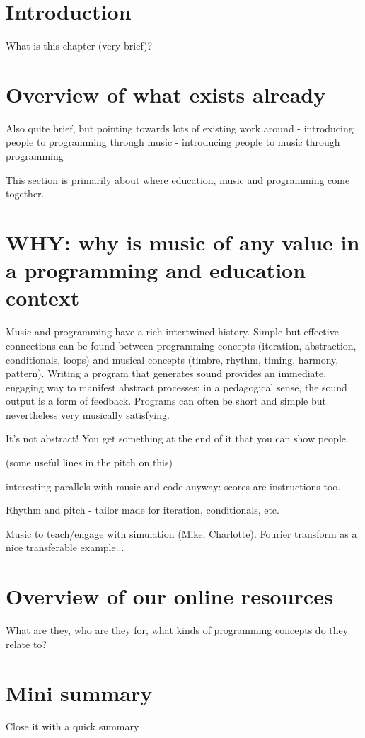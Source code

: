 \section{Introduction}
What is this chapter (very brief)?

\section{Overview of what exists already}
Also quite brief, but pointing towards lots of existing work around
 - introducing people to programming through music
 - introducing people to music through programming

 This section is primarily about where education, music and programming come together.

 

\section{WHY: why is music of any value in a programming and education context}

Music and programming have a rich intertwined history. Simple-but-effective connections can be found between programming concepts (iteration, abstraction, conditionals, loops) and musical concepts (timbre, rhythm, timing, harmony, pattern). Writing a program that generates sound provides an immediate, engaging way to manifest abstract processes; in a pedagogical sense, the sound output is a form of feedback. Programs can often be short and simple but nevertheless very musically satisfying. 



It's not abstract! You get something at the end of it that you can show people.

(some useful lines in the pitch on this)

interesting parallels with music and code anyway: scores are instructions too.

Rhythm and pitch - tailor made for iteration, conditionals, etc.

Music to teach/engage with simulation (Mike, Charlotte). Fourier transform as a nice transferable example...

\section{Overview of our online resources}
What are they, who are they for, what kinds of programming concepts do they relate to?

\section{Mini summary}
Close it with a quick summary

